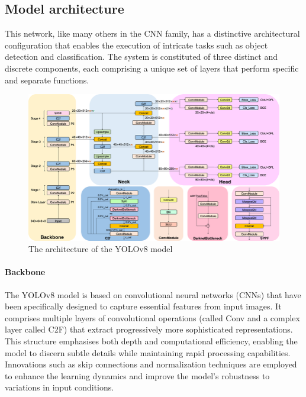 
\subsection{Model architecture}\label{subsec:architecture}
This network, like many others in the CNN family, has a distinctive architectural configuration that
enables the execution of intricate tasks such as object detection and classification.
The system is constituted of three distinct and discrete components,
each comprising a unique set of layers that perform specific and separate functions.

\begin{figure}[ht]
\includegraphics[width=1.0\textwidth]{figures/Detailed-illustration-of-YOLOv8-model-architecture-The-Backbone-Neck-and-Head-are-the}
\caption{The architecture of the YOLOv8 model~\cite{FractureDetection2024}}
\label{fig:architecture}
\end{figure}

\paragraph{Backbone}\label{par:backbone}
The YOLOv8 model is based on convolutional neural networks (CNNs) that have been specifically designed to capture essential features from input images.
It comprises multiple layers of convolutional operations (called Conv and a complex layer called C2F)
that extract progressively more sophisticated representations.
This structure emphasises both depth and computational efficiency,
enabling the model to discern subtle details while maintaining rapid processing capabilities.
Innovations such as skip connections and normalization techniques are employed to enhance the learning dynamics and improve the model's robustness to variations in input conditions.

